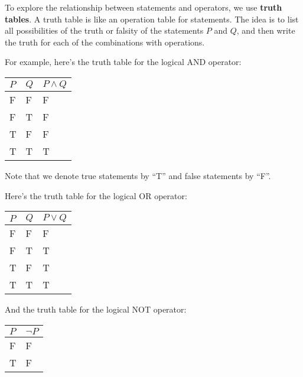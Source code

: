To explore the relationship between statements and operators, we use \textbf{truth tables}. A truth table is like an operation table for statements. The idea is to list all possibilities of the truth or falsity of the statements $P$ and $Q$, and then write the truth for each of the combinations with operations.

For example, here's the truth table for the logical AND operator:
\begin{table}[h]
    \centering
    \begin{tabular}{|l|l||l|}
        \hline
        $P$ & $Q$ & $P\land Q$ \\ \hline
        F   & F   & F          \\ \hline
        F   & T   & F          \\ \hline
        T   & F   & F          \\ \hline
        T   & T   & T          \\ \hline
    \end{tabular}
\end{table}

Note that we denote true statements by ``T'' and false statements by ``F''.

Here's the truth table for the logical OR operator:
\begin{table}[h]
    \centering
    \begin{tabular}{|l|l||l|}
        \hline
        $P$ & $Q$ & $P\lor Q$ \\ \hline
        F   & F   & F         \\ \hline
        F   & T   & T         \\ \hline
        T   & F   & T         \\ \hline
        T   & T   & T         \\ \hline
    \end{tabular}
\end{table}

And the truth table for the logical NOT operator:
\begin{table}[h]
    \centering
    \begin{tabular}{|l||l|}
        \hline
        $P$ & $\lnot P$ \\ \hline
        F   & F         \\ \hline
        T   & F         \\ \hline
    \end{tabular}
\end{table}

